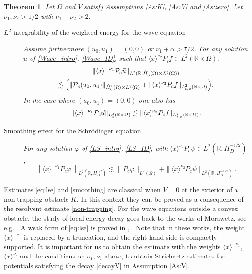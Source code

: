 \documentclass[10pt,leqno]{amsart}
\newtheorem{theorem}{Theorem}[section]
\theoremstyle{definition}%
\theoremstyle{remark}
\numberwithin{equation}{section}
\newcommand{\R}{\mathbb{R}}
\renewcommand{\^}{\widehat}%
\newcommand{\la}{\langle}
\newcommand{\ra}{\rangle}
\newcommand{\PPP}{\mathcal{P}}
\begin{document}
\begin{theorem}
 \label{T:L2}
 Let $\Omega$ and $V$ satisfy Assumptions \ref{As:K}, \ref{As:V} and \ref{As:zero}. 
 Let $\nu_1,\nu_2>1/2$ with $\nu_1+\nu_2>2$.  
\begin{description}
\item[$L^2$-integrability of the weighted energy for the wave equation]
{Assume furthermore $(u_0,u_1)=(0,0)$ or $\nu_1+\alpha>7/2$.}
For any solution $u$ of \eqref{Wave_intro}, \eqref{Wave_ID}, such that $\la x\ra^{\nu_2}P_cf\in L^2(\R\times\Omega)$, 
\begin{multline}
	\label{eq:lse}
	\lVert  \langle x\rangle^{-\nu_1}\PPP_c\vec{u}\rVert_{L^2_t(\R; \dot{H}^1_0(\Omega)\times L^2(\Omega))}\\
	\lesssim \Bigl(\lVert \PPP_c(u_0,u_1)\rVert_{\dot{ H}^1_0(\Omega)\times L^2(\Omega)}+\lVert \langle x\rangle^{\nu_2} P_c f\rVert_{L^2_{t,x}(\R\times\Omega)}\Bigr).
	\end{multline}
	In the case where $(u_0,u_1)=(0,0)$ one also has
	\begin{equation}
	 \label{eq:lse_bis}
	\lVert  \langle x\rangle^{-\nu_1}\PPP_c\vec{u}\rVert_{L^2_t(\R\times \Omega)}\\
	\lesssim \lVert \langle x\rangle^{\nu_2} P_c f\rVert_{L^2_{t,x}(\R\times\Omega)}.
	\end{equation}
\item[Smoothing effect for the Schr\"odinger equation]

For any solution $\varphi$ of \eqref{LS_intro}, \eqref{LS_ID}, with $\la x\ra^{\nu_2} P_c \psi\in L^2(\R,H^{-1/2}_D)$, %
\begin{equation}
\label{smoothing}
\left\| \la x\ra^{-\nu_1} P_c\varphi\right\|_{L^2(\R,H^{1/2}_D)}\lesssim \|P_c \varphi\|_{L^2(\Omega)}+\|\la x\ra^{\nu_2} P_c \psi\|_{L^2(\R,H_D^{-1/2})}. 
\end{equation}
 \end{description}
\end{theorem}
Estimates \eqref{eq:lse} and \eqref{smoothing} are classical when $V=0$ at the exterior of a non-trapping obstacle $K$. In this context they can be proved as a consequence of the resolvent estimate \eqref{non-trapping}. For the wave equations outside a convex obstacle, the study of local energy decay goes back to the works of Morawetz, see e.g. \cite{Morawetz61}. A weak form of \eqref{eq:lse} is proved in \cite[Section 2]{MRS77}, \cite{Burq03}. Note that in these works, the weight $\la x\ra^{-\nu_1}$ is replaced by a truncation, and the right-hand side is compactly supported. It is important for us to obtain the estimate with the weights $\la x\ra^{-\nu_1}$, $\la x\ra^{\nu_2}$ and  the conditions on $\nu_1,\nu_2$ above, to obtain Strichartz estimates for potentials satisfying the decay \eqref{decayV} in Assumption \ref{As:V}.
\end{document}
